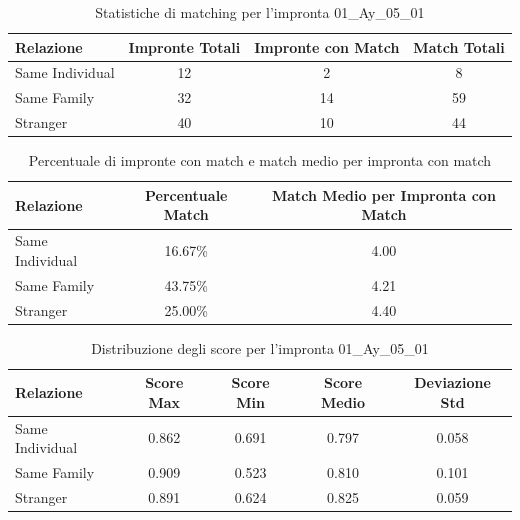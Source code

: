\begin{table}[htbp]
\centering
\caption{Statistiche di matching per l'impronta 01\_Ay\_05\_01}
\label{tab:results_01_Ay_05_01}
\begin{tabular}{|l|c|c|c|}
\hline
\textbf{Relazione} & \textbf{Impronte Totali} & \textbf{Impronte con Match} & \textbf{Match Totali} \\
\hline
Same Individual & 12 & 2 & 8 \\
\hline
Same Family & 32 & 14 & 59 \\
\hline
Stranger & 40 & 10 & 44 \\
\hline
\end{tabular}
\end{table}


\begin{table}[htbp]
\centering
\caption{Percentuale di impronte con match e match medio per impronta con match}
\label{tab:match_percentage_01_Ay_05_01}
\begin{tabular}{|l|c|c|}
\hline
\textbf{Relazione} & \textbf{Percentuale Match} & \textbf{Match Medio per Impronta con Match} \\
\hline
Same Individual & 16.67\% & 4.00 \\
\hline
Same Family & 43.75\% & 4.21 \\
\hline
Stranger & 25.00\% & 4.40 \\
\hline
\end{tabular}
\end{table}


\begin{table}[htbp]
\centering
\caption{Distribuzione degli score per l'impronta 01\_Ay\_05\_01}
\label{tab:scores_01_Ay_05_01}
\begin{tabular}{|l|c|c|c|c|}
\hline
\textbf{Relazione} & \textbf{Score Max} & \textbf{Score Min} & \textbf{Score Medio} & \textbf{Deviazione Std} \\
\hline
Same Individual & 0.862 & 0.691 & 0.797 & 0.058 \\
\hline
Same Family & 0.909 & 0.523 & 0.810 & 0.101 \\
\hline
Stranger & 0.891 & 0.624 & 0.825 & 0.059 \\
\hline
\end{tabular}
\end{table}

